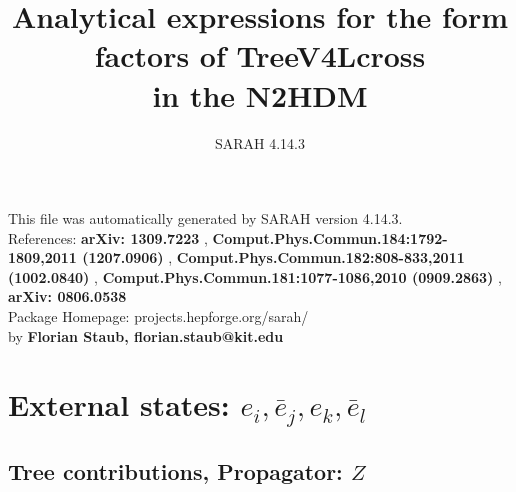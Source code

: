 \documentclass[A4,landscape]{article}
\begin{document}
\title{Analytical expressions for the form factors of TreeV4Lcross\\ in the N2HDM } 
 \author{SARAH 4.14.3} 
 \maketitle 
 \vspace{10cm} 
This file was automatically generated by SARAH version 4.14.3.  \\ 
References: {\bf arXiv: 1309.7223 }, {\bf Comput.Phys.Commun.184:1792-1809,2011 (1207.0906) }, {\bf Comput.Phys.Commun.182:808-833,2011 (1002.0840) }, {\bf Comput.Phys.Commun.181:1077-1086,2010 (0909.2863) }, {\bf arXiv: 0806.0538 } \\ 
Package Homepage: projects.hepforge.org/sarah/ \\ 
by {\bf Florian Staub, florian.staub@kit.edu} 
 \pagebreak 
 \tableofcontents 
 \pagebreak 
\section{External states: ${e_{{i}}, \bar{e}_{{j}}, e_{{k}}, \bar{e}_{{l}}}$} 
\subsection{Tree contributions, Propagator: $Z$} 
\end{document}
